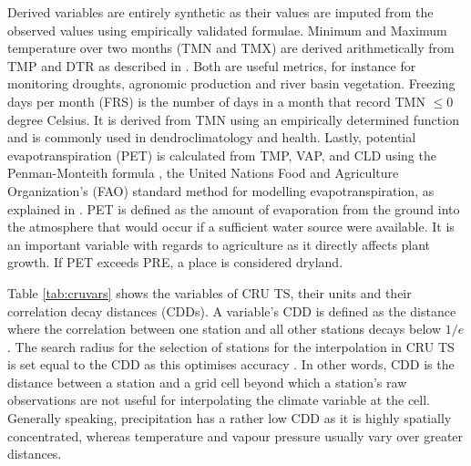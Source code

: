 \documentclass[a4paper,12pt]{article}
\theoremstyle{plain}
\theoremstyle{definition}
\theoremstyle{definition}
\theoremstyle{definition}
\theoremstyle{definition}
\begin{document}
Derived variables are entirely synthetic as their values are imputed from the observed values using empirically validated formulae. Minimum and Maximum temperature over two months (TMN and TMX) are derived arithmetically from TMP and DTR as described in \citet{harris2014}. Both are useful metrics, for instance for monitoring droughts, agronomic production and river basin vegetation. Freezing days per month (FRS) is the number of days in a month that record TMN $\leq 0$ degree Celsius. It is derived from TMN using an empirically determined function and is commonly used in dendroclimatology and health. Lastly, potential evapotranspiration (PET) is calculated from TMP, VAP, and CLD using the Penman-Monteith formula \citep{allen1998}, the United Nations Food and Agriculture Organization's (FAO) standard method for modelling evapotranspiration, as explained in \citet[][pp. 1071 - 1072]{ekstrom2007}. PET is defined as the amount of evaporation from the ground into the atmosphere that would occur if a sufficient water source were available. It is an important variable with regards to agriculture as it directly affects plant growth. If PET exceeds PRE, a place is considered dryland.

Table \ref{tab:cruvars} shows the variables of CRU TS, their units and their correlation decay distances (CDDs). A variable's CDD is defined as the distance where the correlation between one station and all other stations decays below $1/e$. The search radius for the selection of stations for the interpolation in CRU TS is set equal to the CDD as this optimises accuracy \citet{harris2020}. In other words, CDD is the distance between a station and a grid cell beyond which a station's raw observations are not useful for interpolating the climate variable at the cell. Generally speaking, precipitation has a rather low CDD as it is highly spatially concentrated, whereas temperature and vapour pressure usually vary over greater distances.
\end{document}
